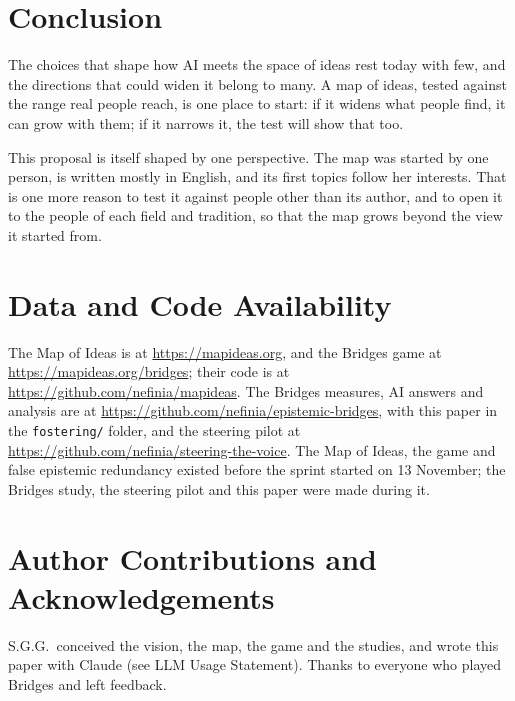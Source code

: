 \documentclass[11pt]{article}
\begin{document}
\section{Conclusion}

The choices that shape how AI meets the space of ideas rest today with few, and the directions that could widen it belong to many. A map of ideas, tested against the range real people reach, is one place to start: if it widens what people find, it can grow with them; if it narrows it, the test will show that too.

This proposal is itself shaped by one perspective. The map was started by one person, is written mostly in English, and its first topics follow her interests. That is one more reason to test it against people other than its author, and to open it to the people of each field and tradition, so that the map grows beyond the view it started from.

\section*{Data and Code Availability}
The Map of Ideas is at \url{https://mapideas.org}, and the Bridges game at \url{https://mapideas.org/bridges}; their code is at \url{https://github.com/nefinia/mapideas}. The Bridges measures, AI answers and analysis are at \url{https://github.com/nefinia/epistemic-bridges}, with this paper in the \texttt{fostering/} folder, and the steering pilot at \url{https://github.com/nefinia/steering-the-voice}. The Map of Ideas, the game and false epistemic redundancy existed before the sprint started on 13 November; the Bridges study, the steering pilot and this paper were made during it.

\section*{Author Contributions and Acknowledgements}
S.G.G.\ conceived the vision, the map, the game and the studies, and wrote this paper with Claude (see LLM Usage Statement). Thanks to everyone who played Bridges and left feedback.
\end{document}
